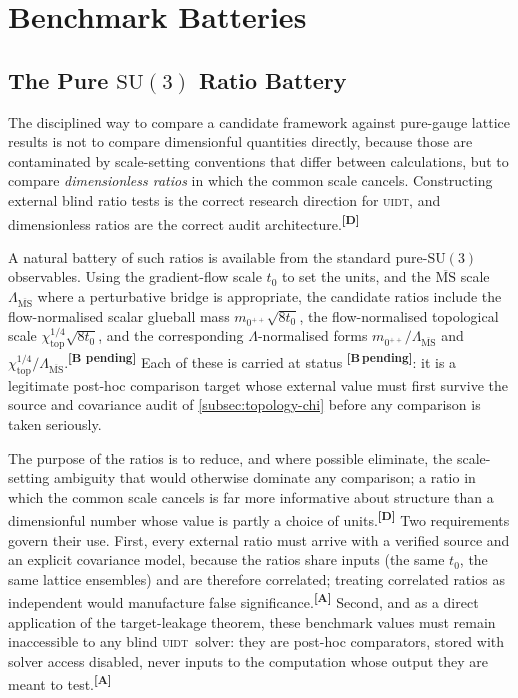 \documentclass[12pt,a4paper,twoside]{article}
\theoremstyle{plain}
\theoremstyle{definition}
\theoremstyle{remark}
\newcommand{\UIDT}{\textsc{uidt}}
\newcommand{\catmark}[1]{\textsuperscript{\textsf{\textbf{[#1]}}}}
\newcommand{\Bpending}{\catmark{B\,pending}}
\begin{document}
\section{Benchmark Batteries}
\label{sec:benchmark-batteries}

\subsection{The Pure \texorpdfstring{$\mathrm{SU}(3)$}{SU(3)} Ratio Battery}
\label{subsec:ratio-battery}

The disciplined way to compare a candidate framework against pure-gauge lattice results is not to compare dimensionful quantities directly, because those are contaminated by scale-setting conventions that differ between calculations, but to compare \emph{dimensionless ratios} in which the common scale cancels. Constructing external blind ratio tests is the correct research direction for \UIDT, and dimensionless ratios are the correct audit architecture.\catmark{D}

A natural battery of such ratios is available from the standard pure-$\mathrm{SU}(3)$ observables. Using the gradient-flow scale $t_0$ to set the units, and the $\overline{\mathrm{MS}}$ scale $\Lambda_{\overline{\mathrm{MS}}}$ where a perturbative bridge is appropriate, the candidate ratios include the flow-normalised scalar glueball mass $m_{0^{++}}\sqrt{8t_0}$, the flow-normalised topological scale $\chi_{\mathrm{top}}^{1/4}\sqrt{8t_0}$, and the corresponding $\Lambda$-normalised forms $m_{0^{++}}/\Lambda_{\overline{\mathrm{MS}}}$ and $\chi_{\mathrm{top}}^{1/4}/\Lambda_{\overline{\mathrm{MS}}}$.\catmark{B pending} Each of these is carried at status \Bpending: it is a legitimate post-hoc comparison target whose external value must first survive the source and covariance audit of \cref{subsec:topology-chi} before any comparison is taken seriously.

The purpose of the ratios is to reduce, and where possible eliminate, the scale-setting ambiguity that would otherwise dominate any comparison; a ratio in which the common scale cancels is far more informative about structure than a dimensionful number whose value is partly a choice of units.\catmark{D} Two requirements govern their use. First, every external ratio must arrive with a verified source and an explicit covariance model, because the ratios share inputs (the same $t_0$, the same lattice ensembles) and are therefore correlated; treating correlated ratios as independent would manufacture false significance.\catmark{A} Second, and as a direct application of the target-leakage theorem, these benchmark values must remain inaccessible to any blind \UIDT\ solver: they are post-hoc comparators, stored with solver access disabled, never inputs to the computation whose output they are meant to test.\catmark{A}
\end{document}
